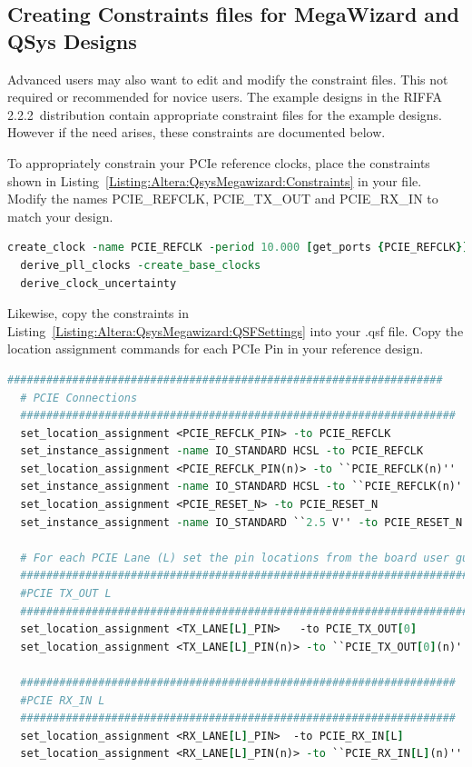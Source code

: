 \documentclass{refrep}
\newcommand{\RIFFAVer}{2.2.2}
\newcommand{\Altera}[1]{{\color{blue}{#1}}}
\begin{document}
\pagebreak
\subsection{Creating Constraints files for MegaWizard and QSys Designs}
\label{Sec:Altera:QsysMegawizard:Constraints}
Advanced users may also want to edit and modify the constraint files. This not
required or recommended for novice users. The example designs in the RIFFA
\RIFFAVer~distribution contain appropriate constraint files for the example
designs. However if the need arises, these constraints are documented below.

To appropriately constrain your PCIe reference clocks, place the constraints
shown in Listing~\ref{Listing:Altera:QsysMegawizard:Constraints} in your
\Altera{.sdc} file. Modify the names PCIE\_REFCLK, PCIE\_TX\_OUT and
PCIE\_RX\_IN to match your design.
\begin{lstlisting}[basicstyle=\footnotesize\ttfamily,language=tcl,
    commentstyle=\color{red},label=Listing:Altera:QsysMegawizard:Constraints,
    caption=\Altera{.sdc} constraints for Qsys and Megawizard designs,frame=single]
  create_clock -name PCIE_REFCLK -period 10.000 [get_ports {PCIE_REFCLK}]
  derive_pll_clocks -create_base_clocks
  derive_clock_uncertainty
\end{lstlisting}
Likewise, copy the constraints in
Listing~\ref{Listing:Altera:QsysMegawizard:QSFSettings} into your .qsf file. Copy
the location assignment commands for each PCIe Pin in your reference design.

\begin{lstlisting}[language=tcl,basicstyle=\footnotesize\ttfamily,commentstyle=\color{red},
    label=Listing:Altera:QsysMegawizard:QSFSettings,
    caption=\Altera{.qsf} settings for Qsys and Megawizard designs,frame=single]
  ###################################################################
  # PCIE Connections
  ###################################################################
  set_location_assignment <PCIE_REFCLK_PIN> -to PCIE_REFCLK
  set_instance_assignment -name IO_STANDARD HCSL -to PCIE_REFCLK
  set_location_assignment <PCIE_REFCLK_PIN(n)> -to ``PCIE_REFCLK(n)''
  set_instance_assignment -name IO_STANDARD HCSL -to ``PCIE_REFCLK(n)''
  set_location_assignment <PCIE_RESET_N> -to PCIE_RESET_N
  set_instance_assignment -name IO_STANDARD ``2.5 V'' -to PCIE_RESET_N

  # For each PCIE Lane (L) set the pin locations from the board user guide!
  ######################################################################
  #PCIE TX_OUT L
  ######################################################################
  set_location_assignment <TX_LANE[L]_PIN>   -to PCIE_TX_OUT[0]
  set_location_assignment <TX_LANE[L]_PIN(n)> -to ``PCIE_TX_OUT[0](n)''

  ###################################################################
  #PCIE RX_IN L
  ###################################################################
  set_location_assignment <RX_LANE[L]_PIN>  -to PCIE_RX_IN[L]
  set_location_assignment <RX_LANE[L]_PIN(n)> -to ``PCIE_RX_IN[L](n)''
\end{lstlisting}
\pagebreak
\end{document}
